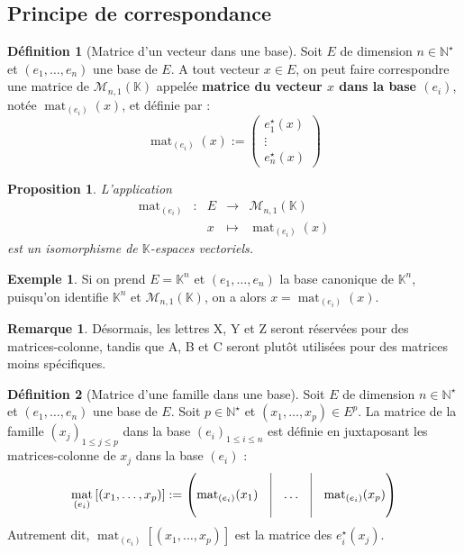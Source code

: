 \documentclass[french]{book}
\newcommand{\N}{\mathbb{N}}
\newcommand{\K}{\mathbb{K}}
\newcommand{\st}{^\star}
\theoremstyle{plain}
\newtheorem{prop}{Proposition}[chapter]
\theoremstyle{definition}
\newtheorem{dfn}{Définition}[chapter]
\newtheorem{exa}{Exemple}[chapter]
\newtheorem{rmq}{Remarque}[chapter]
\theoremstyle{remark}
\DeclareMathOperator{\mat}{mat}
\begin{document}
\subsection{Principe de correspondance}
\begin{dfn}[Matrice d'un vecteur dans une base]
	Soit $E$ de dimension $n\in\N\st$ et $(e_1,\ldots,e_n)$ une base de $E$. A tout vecteur $x\in E$, on peut faire correspondre une matrice de $\mathcal{M}_{n,1}(\K)$ appelée \textbf{matrice du vecteur $x$ dans la base $(e_i)$}, notée $\mat_{(e_i)}(x)$, et définie par : $$\mat_{(e_i)}(x):=\begin{pmatrix}e_1\st(x)\\ \vdots\\ e_n\st(x)\end{pmatrix}$$
\end{dfn}
\begin{prop}
	L'application $$\begin{array}{ccccc}\mat_{(e_i)}&:&E&\rightarrow&\mathcal{M}_{n,1}(\K)\\&&x&\mapsto&\mat_{(e_i)}(x)\end{array}$$ est un isomorphisme de $\K$-espaces vectoriels.
\end{prop}
\begin{exa}
	Si on prend $E=\K^n$ et $(e_1,\ldots,e_n)$ la base canonique de $\K^n$, puisqu'on identifie $\K^n$ et $\mathcal{M}_{n,1}(\K)$, on a alors $x=\mat_{(e_i)}(x)$.
\end{exa}
\begin{rmq}
	Désormais, les lettres X, Y et Z seront réservées pour des matrices-colonne, tandis que A, B et C seront plutôt utilisées pour des matrices moins spécifiques.
\end{rmq}
\begin{dfn}[Matrice d'une famille dans une base]
	Soit $E$ de dimension $n\in\N\st$ et $(e_1,\ldots,e_n)$ une base de $E$. Soit $p\in\N\st$ et $(x_1,\ldots,x_p)\in E^p$. La matrice de la famille $(x_j)_{1\leqslant j\leqslant p}$ dans la base $(e_i)_{1\leqslant i\leqslant n}$ est définie en juxtaposant les matrices-colonne de $x_j$ dans la base $(e_i)$ : $$\mat_{(e_i)}\left[(x_1,\ldots,x_p)\right]:=\begin{pmatrix}&\vline&&\vline&\\\mat_{(e_i)}(x_1)&\vline&\ldots&\vline&\mat_{(e_i)}(x_p)\\&\vline&&\vline&\end{pmatrix}$$ Autrement dit, $\mat_{(e_i)}\left[(x_1,\ldots,x_p)\right]$ est la matrice des $e_i\st(x_j)$.
\end{dfn}
\end{document}
